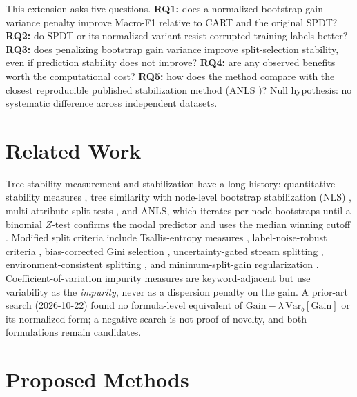 \documentclass[conference]{IEEEtran}
\begin{document}
This extension asks five questions.
\textbf{RQ1:} does a normalized bootstrap gain-variance penalty improve
Macro-F1 relative to CART and the original SPDT?
\textbf{RQ2:} do SPDT or its normalized variant resist corrupted training
labels better?
\textbf{RQ3:} does penalizing bootstrap gain variance improve
split-selection stability, even if prediction stability does not improve?
\textbf{RQ4:} are any observed benefits worth the computational cost?
\textbf{RQ5:} how does the method compare with the closest reproducible
published stabilization method (ANLS \cite{lee2024anls})?
Null hypothesis: no systematic difference across independent datasets.

\section{Related Work}
Tree stability measurement and stabilization have a long history:
quantitative stability measures \cite{turney1995stability}, tree
similarity with node-level bootstrap stabilization (NLS)
\cite{briand2009stability,dannegger2000nls}, multi-attribute split tests
\cite{mirzamomen2017stable}, and ANLS, which iterates per-node
bootstraps until a binomial $Z$-test confirms the modal predictor and
uses the median winning cutoff \cite{lee2024anls}. Modified split
criteria include Tsallis-entropy measures \cite{wang2017tsallis},
label-noise-robust criteria \cite{yang2019pairgain}, bias-corrected Gini
selection \cite{strobl2007bias}, uncertainty-gated stream splitting
\cite{domingos2000vfdt}, environment-consistent splitting
\cite{delise2026era}, and minimum-split-gain regularization
\cite{chen2016xgboost}. Coefficient-of-variation impurity measures
\cite{himabindu2015cvdt} are keyword-adjacent but use variability as the
\emph{impurity}, never as a dispersion penalty on the gain. A prior-art
search (2026-10-22) found no formula-level equivalent of
$\mathrm{Gain}-\lambda\,\mathrm{Var}_b[\mathrm{Gain}]$ or its
normalized form; a negative search is not proof of novelty, and both
formulations remain candidates.

\section{Proposed Methods}
\end{document}
